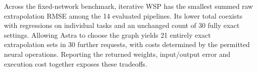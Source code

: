 Across the fixed-network benchmark, iterative WSP has the smallest summed raw extrapolation RMSE among the 14 evaluated pipelines. Its lower total coexists with regressions on individual tasks and an unchanged count of 30 fully exact settings. Allowing Astra to choose the graph yields 21 entirely exact extrapolation sets in 30 further requests, with costs determined by the permitted neural operations. Reporting the returned weights, input/output error and execution cost together exposes these tradeoffs.

